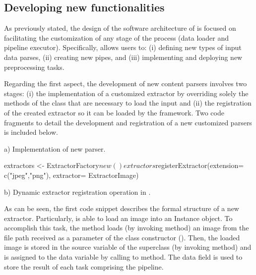 \subsection{Developing new functionalities}

As previously stated, the design of the software architecture of  is focused on facilitating the customization of any stage of the process (data loader and pipeline executor). Specifically,  allows users to: (i) defining new types of input data parses, (ii) creating new pipes, and (iii) implementing and deploying new preprocessing tasks.

Regarding the first aspect, the development of new content parsers involves two stages: (i) the implementation of a customized extractor by overriding solely the methods of the  class that are necessary to load the input and (ii) the registration of the created extractor so it can be loaded by the  framework. Two code fragments to detail the development and registration of a new customized parsers is included below.

a) Implementation of new  parser.	

\begin{example}
extractors <- ExtractorFactory$new()
extractors$registerExtractor(extension= c("jpeg","png"), 
                             extractor= ExtractorImage)
\end{example}
b) Dynamic extractor registration operation in .

As can be seen, the first code snippet describes the formal structure of a new extractor. Particularly,  is able to load an image into an Instance object. To accomplish this task, the  method loads (by invoking  method) an image from the file path received as a parameter of the class constructor (). Then, the loaded image is stored in the source variable of the  superclass (by invoking  method) and is assigned to the data variable by calling to  method. The data field is used to store the result of each task comprising the pipeline.

